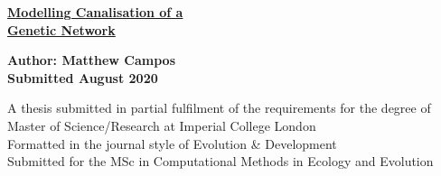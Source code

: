 \begin{titlepage}
    \begin{center}
    \vspace*{1cm}

    \Huge
    \textbf{\underline{Modelling Canalisation of a}}\\
    \textbf{\underline{Genetic Network}}\\

    \vspace*{2.0cm}

    \large
    \textbf{Author: Matthew Campos}\\
    \textbf{Submitted August 2020}

    \vspace*{0.8cm}

    \normalsize
    A thesis submitted in partial fulfilment of the requirements for the degree of Master of Science/Research at Imperial College London\\
    Formatted in the journal style of Evolution \& Development\\
    Submitted for the MSc in Computational Methods in Ecology and Evolution\\

    \vspace*{0.8cm}

    \end{center}
\end{titlepage}
